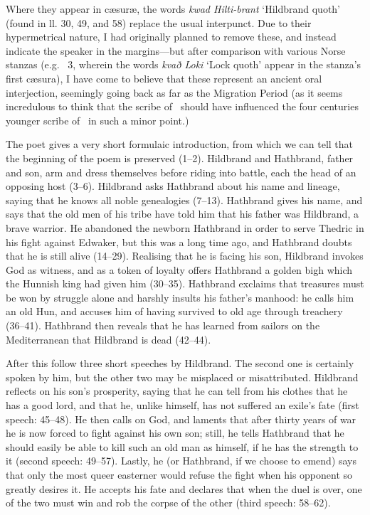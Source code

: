 Where they appear in cæsuræ, the words \emph{kwad Hilti-brant} ‘Hildbrand quoth’ (found in ll. 30, 49, and 58) replace the usual interpunct. Due to their hypermetrical nature, I had originally planned to remove these, and instead indicate the speaker in the margins—but after comparison with various Norse stanzas (e.g. \Reginsmal\ 3, wherein the words \emph{kvað Loki} ‘Lock quoth’ appear in the stanza’s first cæsura), I have come to believe that these represent an ancient oral interjection, seemingly going back as far as the Migration Period (as it seems incredulous to think that the scribe of \HildMS\ should have influenced the four centuries younger scribe of \Regius\ in such a minor point.)


\sectionline

The poet gives a very short formulaic introduction, from which we can tell that the beginning of the poem is preserved (1–2). Hildbrand and Hathbrand, father and son, arm and dress themselves before riding into battle, each the head of an opposing host (3–6). Hildbrand asks Hathbrand about his name and lineage, saying that he knows all noble genealogies (7–13). Hathbrand gives his name, and says that the old men of his tribe have told him that his father was Hildbrand, a brave warrior. He abandoned the newborn Hathbrand in order to serve Thedric in his fight against Edwaker, but this was a long time ago, and Hathbrand doubts that he is still alive (14–29). Realising that he is facing his son, Hildbrand invokes God as witness, and as a token of loyalty offers Hathbrand a golden bigh which the Hunnish king had given him (30–35). Hathbrand exclaims that treasures must be won by struggle alone and harshly insults his father’s manhood: he calls him an old Hun, and accuses him of having survived to old age through treachery (36–41). Hathbrand then reveals that he has learned from sailors on the Mediterranean that Hildbrand is dead (42–44).

After this follow three short speeches by Hildbrand. The second one is certainly spoken by him, but the other two may be misplaced or misattributed. Hildbrand reflects on his son’s prosperity, saying that he can tell from his clothes that he has a good lord, and that he, unlike himself, has not suffered an exile’s fate (first speech: 45–48). He then calls on God, and laments that after thirty years of war he is now forced to fight against his own son; still, he tells Hathbrand that he should easily be able to kill such an old man as himself, if he has the strength to it (second speech: 49–57). Lastly, he (or Hathbrand, if we choose to emend) says that only the most queer easterner would refuse the fight when his opponent so greatly desires it. He accepts his fate and declares that when the duel is over, one of the two must win and rob the corpse of the other (third speech: 58–62).

